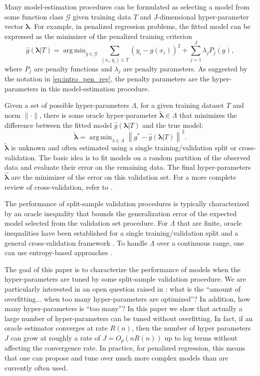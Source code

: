 \documentclass[12pt]{article} %
\theoremstyle{definition}
\DeclareMathOperator*{\argmin}{arg\,min}
\begin{document}
Many model-estimation procedures can be formulated as selecting a model from some function class $\mathcal{G}$ given training data $T$ and $J$-dimensional hyper-parameter vector $\boldsymbol{\lambda}$. For example, in penalized regression problems, the fitted model can be expressed as the minimizer of the penalized training criterion
\begin{equation}
\label{eq:intro_pen_reg}
\hat{g}(\boldsymbol \lambda | T) = \argmin_{g\in \mathcal{G}} \sum_{(x_i, y_i) \in T} \left (y_i -  g(x_i) \right )^2 + \sum_{j=1}^J \lambda_j P_j(g),
\end{equation}
where $P_j$ are penalty functions and $\lambda_j$ are penalty parameters. As suggested by the notation in \eqref{eq:intro_pen_reg}, the penalty parameters are the hyper-parameters in this model-estimation procedure.

Given a set of possible hyper-parameters $\Lambda$, for a given training dataset $T$ and norm $\|\cdot\|$, there is some oracle hyper-parameter $\tilde{\boldsymbol{\lambda}} \in \Lambda$ that minimizes the difference between the fitted model $\hat{g}\left(\boldsymbol{\lambda|}T\right)$ and the true model:
\[
\tilde{\boldsymbol{\lambda}} = \argmin_{\lambda \in \Lambda} \left\|g^{*} - \hat{g}\left(\boldsymbol{\lambda|}T\right)\right\|^2.
\]
$\tilde{\boldsymbol{\lambda}}$ is unknown and often estimated using a single training/validation split or cross-validation. The basic idea is to fit models on a random partition of the observed data and evaluate their error on the remaining data. The final hyper-parameters $\hat{\boldsymbol{\lambda}}$ are the minimizer of the error on this validation set. For a more complete review of cross-validation, refer to \citet{arlot2010survey}.

The performance of split-sample validation procedures is typically characterized by an oracle inequality that bounds the generalization error of the expected model selected from the validation set procedure. For $\Lambda$ that are finite, oracle inequalities have been established for a single training/validation split \citep{gyorfi2006distribution} and a general cross-validation framework \citep{van2003unified, van2004asymptotic}. To handle $\Lambda$ over a continuous range, one can use entropy-based approaches \citep{lecue2012oracle}. 

The goal of this paper is to characterize the performance of models when the hyper-parameters are tuned by some split-sample validation procedure. We are particularly interested in an open question raised in \citet{bengio2000gradient}: what is the ``amount of overfitting... when too many hyper-parameters are optimized''? In addition, how many hyper-parameters is ``too many''? In this paper we show that actually a large number of hyper-parameters can be tuned without overfitting. In fact, if an oracle estimator converges at rate $R(n)$, then the number of hyper parameters $J$ can grow at roughly a rate of $J = O_p(nR(n))$ up to log terms without affecting the convergence rate. In practice, for penalized regression, this means that one can propose and tune over much more complex models than are currently often used.
\end{document}
